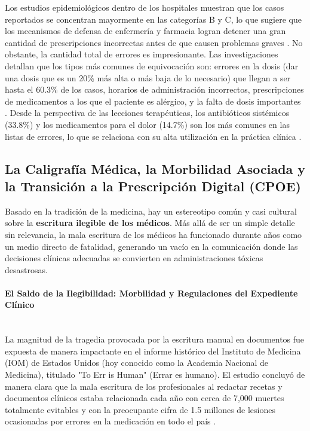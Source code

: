 Los estudios epidemiológicos dentro de los hospitales muestran que los casos reportados se concentran mayormente en las categorías B y C, lo que sugiere que los mecanismos de defensa de enfermería y farmacia logran detener una gran cantidad de prescripciones incorrectas antes de que causen problemas graves \cite{ilaphar2024errores}. No obstante, la cantidad total de errores es impresionante. Las investigaciones detallan que los tipos más comunes de equivocación son: errores en la dosis (dar una dosis que es un 20\% más alta o más baja de lo necesario) que llegan a ser hasta el 60.3\% de los casos, horarios de administración incorrectos, prescripciones de medicamentos a los que el paciente es alérgico, y la falta de dosis importantes \cite{msp_uruguay_errores}. Desde la perspectiva de las lecciones terapéuticas, los antibióticos sistémicos (33.8\%) y los medicamentos para el dolor (14.7\%) son los más comunes en las listas de errores, lo que se relaciona con su alta utilización en la práctica clínica \cite{ilaphar2019errores_mexico}.

\subsection{La Caligrafía Médica, la Morbilidad Asociada y la Transición a la Prescripción Digital (CPOE)}

Basado en la tradición de la medicina, hay un estereotipo común y casi cultural sobre la \textbf{escritura ilegible de los médicos}. Más allá de ser un simple detalle sin relevancia, la mala escritura de los médicos ha funcionado durante años como un medio directo de fatalidad, generando un vacío en la comunicación donde las decisiones clínicas adecuadas se convierten en administraciones tóxicas desastrosas.

\paragraph{El Saldo de la Ilegibilidad: Morbilidad y Regulaciones del Expediente Clínico}\leavevmode \\

La magnitud de la tragedia provocada por la escritura manual en documentos fue expuesta de manera impactante en el informe histórico del Instituto de Medicina (IOM) de Estados Unidos (hoy conocido como la Academia Nacional de Medicina), titulado "To Err is Human" (Errar es humano). El estudio concluyó de manera clara que la mala escritura de los profesionales al redactar recetas y documentos clínicos estaba relacionada cada año con cerca de 7,000 muertes totalmente evitables y con la preocupante cifra de 1.5 millones de lesiones ocasionadas por errores en la medicación en todo el país \cite{healthwise_handwriting_errors}.

